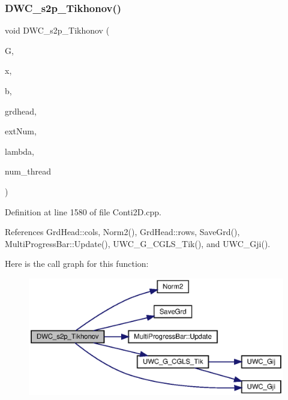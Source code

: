 \subsubsection{D\+W\+C\+\_\+s2p\+\_\+\+Tikhonov()}
{\footnotesize\ttfamily void D\+W\+C\+\_\+s2p\+\_\+\+Tikhonov (\begin{DoxyParamCaption}\item[{double $\ast$$\ast$}]{G,  }\item[{double $\ast$}]{x,  }\item[{double $\ast$}]{b,  }\item[{\textbf{ Grd\+Head}}]{grdhead,  }\item[{int}]{ext\+Num,  }\item[{double}]{lambda,  }\item[{int}]{num\+\_\+thread }\end{DoxyParamCaption})}



Definition at line 1580 of file Conti2\+D.\+cpp.



References Grd\+Head\+::cols, Norm2(), Grd\+Head\+::rows, Save\+Grd(), Multi\+Progress\+Bar\+::\+Update(), U\+W\+C\+\_\+\+G\+\_\+\+C\+G\+L\+S\+\_\+\+Tik(), and U\+W\+C\+\_\+\+Gji().

Here is the call graph for this function\+:
\nopagebreak
\begin{figure}[H]
\begin{center}
\leavevmode
\includegraphics[width=350pt]{Conti2D_8h_a08f63b90a388692c22c4799d19a80207_a08f63b90a388692c22c4799d19a80207_cgraph}
\end{center}
\end{figure}
\mbox{\label{Conti2D_8h_aca8df189bd3e80e2041b22f7691d87b0_aca8df189bd3e80e2041b22f7691d87b0}} 
